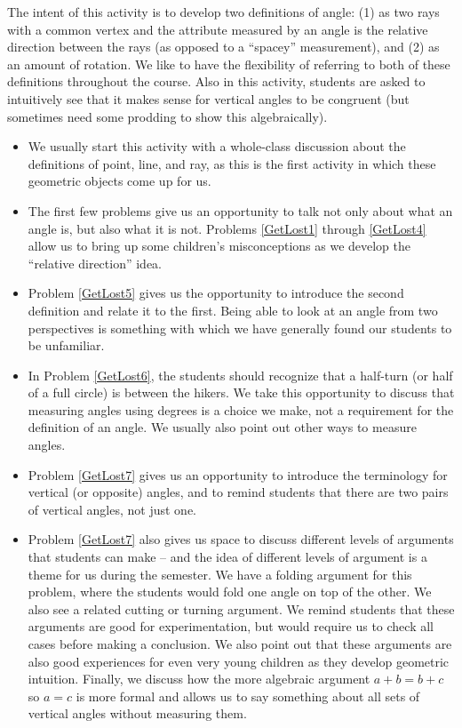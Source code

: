 \documentclass{ximera}
\begin{document}
\begin{instructorNotes}
The intent of this activity is to develop two definitions of angle:
(1) as two rays with a common vertex and the attribute measured by an angle is the relative direction between the rays (as opposed to a ``spacey'' measurement), and (2) as an amount of rotation.  We like to have the flexibility of referring to both of these definitions throughout the course.  Also in this activity, students are asked to intuitively see that it makes sense for vertical angles to be congruent (but sometimes need some prodding to show this algebraically).

\begin{itemize}
    \item We usually start this activity with a whole-class discussion about the definitions of point, line, and ray, as this is the first activity in which these geometric objects come up for us.
    \item The first few problems give us an opportunity to talk not only about what an angle is, but also what it is not.  Problems \ref{GetLost1} through \ref{GetLost4} allow us to bring up some children's misconceptions as we develop the ``relative direction'' idea.
    \item Problem \ref{GetLost5} gives us the opportunity to introduce the second definition and relate it to the first.  Being able to look at an angle from two perspectives is something with which we have generally found our students to be unfamiliar.
    \item In Problem \ref{GetLost6}, the students should recognize that a half-turn (or half of a full circle) is between the hikers.  We take this opportunity to discuss that measuring angles using degrees is a choice we make, not a requirement for the definition of an angle.  We usually also point out other ways to measure angles.
    \item Problem \ref{GetLost7} gives us an opportunity to introduce the terminology for vertical (or opposite) angles, and to remind students that there are two pairs of vertical angles, not just one.
    \item Problem \ref{GetLost7} also gives us space to discuss different levels of arguments that students can make -- and the idea of different levels of argument is a theme for us during the semester.  We have a folding argument for this problem, where the students would fold one angle on top of the other.  We also see a related cutting or turning argument.  We remind students that these arguments are good for experimentation, but would require us to check all cases before making a conclusion.  We also point out that these arguments are also good experiences for even very young children as they develop geometric intuition.  Finally, we discuss how the more algebraic argument $a+b = b+c$ so $a = c$ is more formal and allows us to say something about all sets of vertical angles without measuring them.
\end{itemize}

\end{instructorNotes}
\end{document}
